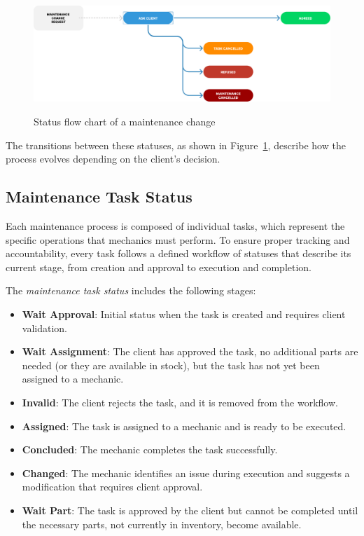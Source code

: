 \begin{figure}[h]
  \caption{Status flow chart of a maintenance change}
  \centering
  \includegraphics[width=\textwidth]{figs/Status/MaintenanceChange/StatusDiagram}
  \label{fig:maintenanceChangeFlowChart}
\end{figure}


The transitions between these statuses, as shown in Figure~\ref{fig:maintenanceChangeFlowChart}, describe how the process evolves depending on the client's decision.

\subsection{Maintenance Task Status} 

Each maintenance process is composed of individual tasks, which represent the specific operations that mechanics must perform. To ensure proper tracking and accountability, every task follows a defined workflow of statuses that describe its current stage, from creation and approval to execution and completion.

The \textit{maintenance task status} includes the following stages:
\begin{itemize}
\item \textbf{Wait Approval}: Initial status when the task is created and requires client validation.
\item \textbf{Wait Assignment}: The client has approved the task, no additional parts are needed (or they are available in stock), but the task has not yet been assigned to a mechanic.
\item \textbf{Invalid}: The client rejects the task, and it is removed from the workflow.
\item \textbf{Assigned}: The task is assigned to a mechanic and is ready to be executed.
\item \textbf{Concluded}: The mechanic completes the task successfully.
\item \textbf{Changed}: The mechanic identifies an issue during execution and suggests a modification that requires client approval.
\item \textbf{Wait Part}: The task is approved by the client but cannot be completed until the necessary parts, not currently in inventory, become available.
\end{itemize}


